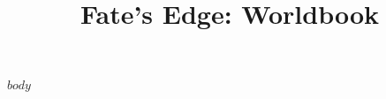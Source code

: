 \documentclass[11pt,letterpaper]{report}
\title{Fate's Edge: Worldbook}
\author{}
\date{}
\begin{document}
\maketitle
\tableofcontents
\newpage

$body$
\end{document}
